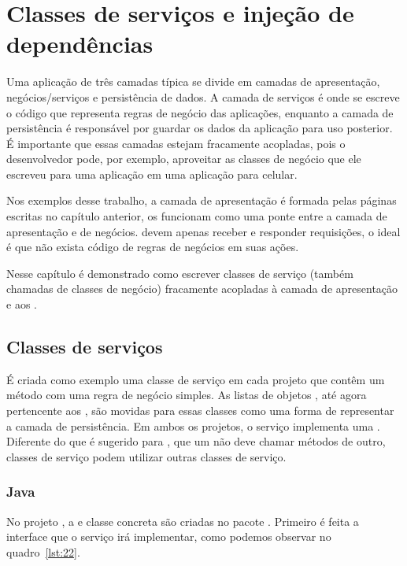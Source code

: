 \chapter{Classes de serviços e injeção de dependências}

Uma aplicação de três camadas típica se divide em camadas de apresentação, negócios/serviços e persistência de dados. A camada de serviços é onde se escreve o código que representa regras de negócio das aplicações, enquanto a camada de persistência é responsável por guardar os dados da aplicação para uso posterior. É importante que essas camadas estejam fracamente acopladas, pois o desenvolvedor pode, por exemplo, aproveitar as classes de negócio que ele escreveu para uma aplicação  em uma aplicação para celular.

Nos exemplos desse trabalho, a camada de apresentação é formada pelas páginas  escritas no capítulo anterior, os  funcionam como uma ponte entre a camada de apresentação e de negócios.  devem apenas receber e responder requisições, o ideal é que não exista código de regras de negócios em suas ações.

Nesse capítulo é demonstrado como escrever classes de serviço (também chamadas de classes de negócio) fracamente acopladas à camada de apresentação e aos . 

\section{Classes de serviços}

É criada como exemplo uma classe de serviço em cada projeto que contêm um método com uma regra de negócio simples. As listas de objetos , até agora pertencente aos , são movidas para essas classes como uma forma de representar a camada de persistência. Em ambos os projetos, o serviço implementa uma . Diferente do que é sugerido para , que um  não deve chamar métodos de outro, classes de serviço podem utilizar outras classes de serviço.

\subsection{Java}

No projeto , a  e classe concreta são criadas no pacote . Primeiro é feita a interface  que o serviço irá implementar, como podemos observar no quadro~\ref{lst:22}.

